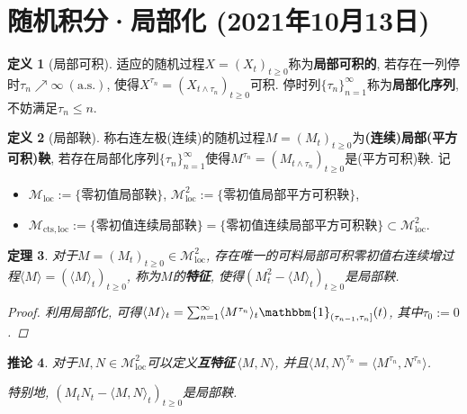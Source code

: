 \documentclass{ctexart}
\theoremstyle{definition}
\newtheorem{Def}{定义}[section]
\theoremstyle{remark}
\theoremstyle{plain}
\newtheorem{Thm}[Def]{定理}
\newtheorem{Cor}[Def]{推论}
\newcommand{\1}{\mathbbm{1}}				%
\newcommand{\as}{\mathrm{a.s.}}				%
\newcommand{\agp}[1]{\langle #1 \rangle}	%
\begin{document}
\section{随机积分·局部化 \normalfont\footnotesize (2021年10月13日)}
\begin{Def}[局部可积]
适应的随机过程$X = (X_{t})_{t \ge 0}$称为\textbf{局部可积的}, 若存在一列停时$\tau_{n} \nearrow \infty ~(\as)$, 使得$X^{\tau_{n}} = (X_{t\wedge\tau_{n}})_{t \ge 0}$可积.
停时列$\{\tau_{n}\}_{n=1}^{\infty}$称为\textbf{局部化序列}, 不妨满足$\tau_{n} \le n$.
\end{Def}
\begin{Def}[局部鞅]
称右连左极(连续)的随机过程$M = (M_{t})_{t \ge 0}$为\textbf{(连续)局部(平方可积)鞅}, 若存在局部化序列$\{\tau_{n}\}_{n=1}^{\infty}$使得$M^{\tau_{n}} = (M_{t\wedge\tau_{n}})_{t \ge 0}$是(平方可积)鞅. 记\begin{itemize}
	\item $\mathcal{M}_{\mathrm{loc}} := \{ \text{零初值}\text{局部鞅} \}$, $\mathcal{M}^{2}_{\mathrm{loc}} := \{ \text{零初值}\text{局部平方可积鞅} \}$,
	\item $\mathcal{M}_{\mathrm{cts},\mathrm{loc}} := \{ \text{零初值}\text{连续}\text{局部鞅} \} = \{ \text{零初值}\text{连续}\text{局部平方可积鞅} \} \subset \mathcal{M}^{2}_{\mathrm{loc}}$.
\end{itemize}
\end{Def}

\begin{Thm}
对于$M = (M_{t})_{t \ge 0} \in \mathcal{M}^{2}_{\mathrm{loc}}$, 存在唯一的可料局部可积零初值右连续增过程$\agp{M} = (\agp{M}_{t})_{t \ge 0}$, 称为$M$的\textbf{特征}, 使得$(M_{t}^{2}-\agp{M}_{t})_{t \ge 0}$是局部鞅.
\begin{proof}
利用局部化, 可得$\agp{M}_{t} = \sum_{n=1}^{\infty} \agp{M^{\tau_{n}}}_{t} \1_{(\tau_{n-1},\tau_{n}]}(t)$, 其中$\tau_{0} := 0$.
\end{proof}
\end{Thm}
\begin{Cor}
对于$M,N \in \mathcal{M}^{2}_{\mathrm{loc}}$可以定义\textbf{互特征}\,$\agp{M,N}$, 并且$\agp{M,N}^{\tau_{n}} = \agp{M^{\tau_{n}},N^{\tau_{n}}}$. \par
特别地, $(M_{t}N_{t}-\agp{M,N}_{t})_{t \ge 0}$是局部鞅.
\end{Cor}
\end{document}
